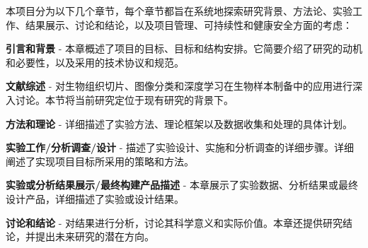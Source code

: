 




本项目分为以下几个章节，每个章节都旨在系统地探索研究背景、方法论、实验工作、结果展示、讨论和结论，以及项目管理、可持续性和健康安全方面的考虑：

\textbf{引言和背景} - 本章概述了项目的目标、目标和结构安排。它简要介绍了研究的动机和必要性，以及采用的技术协议和规范。

\textbf{文献综述} - 对生物组织切片、图像分类和深度学习在生物样本制备中的应用进行深入讨论。本节将当前研究定位于现有研究的背景下。

\textbf{方法和理论} - 详细描述了实验方法、理论框架以及数据收集和处理的具体计划。

\textbf{实验工作/分析调查/设计} - 描述了实验设计、实施和分析调查的详细步骤。详细阐述了实现项目目标所采用的策略和方法。

\textbf{实验或分析结果展示/最终构建产品描述} - 本章展示了实验数据、分析结果或最终设计产品，详细描述了实验或设计结果。

\textbf{讨论和结论} - 对结果进行分析，讨论其科学意义和实际价值。本章还提供研究结论，并提出未来研究的潜在方向。

